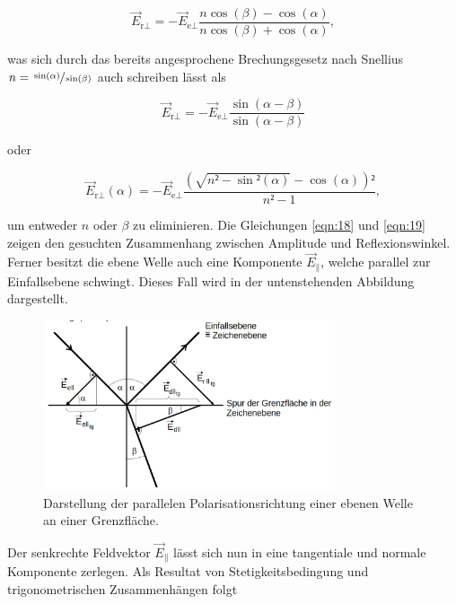 \begin{equation*}
    \vec{E}_{\text{r}\perp} = -\vec{E}_{\text{e}\perp}\frac{n\cos(\beta)-\cos(\alpha)}{n\cos(\beta)+\cos(\alpha)},
\end{equation*}

\noindent was sich durch das bereits angesprochene Brechungsgesetz nach Snellius $n = \sfrac{\sin(\alpha)}{\sin(\beta)}$ auch schreiben lässt als

\begin{equation}
    \vec{E}_{\text{r}\perp} = -\vec{E}_{\text{e}\perp}\frac{\sin(\alpha-\beta)}{\sin(\alpha-\beta)}
    \label{eqn:18}
\end{equation}

oder 

\begin{equation}
    \vec{E}_{\text{r}\perp}(\alpha) = -\vec{E}_{\text{e}\perp}\frac{\left(\sqrt{n²-\sin²(\alpha)}-\cos(\alpha)\right)²}{n²-1},
    \label{eqn:19}
\end{equation}

\noindent um entweder $n$ oder $\beta$ zu eliminieren. Die Gleichungen \eqref{eqn:18} und \eqref{eqn:19} zeigen den gesuchten Zusammenhang zwischen 
Amplitude und Reflexionswinkel.\\

\noindent Ferner besitzt die ebene Welle auch eine Komponente $\vec{E}_\parallel$, welche parallel zur Einfallsebene schwingt. Dieses Fall wird in der 
untenstehenden Abbildung dargestellt.

\begin{figure}
    \centering
    \includegraphics[height=5cm]{senkPolar.png}
    \caption{Darstellung der parallelen Polarisationsrichtung einer ebenen Welle an einer Grenzfläche\cite{Versuchsanleitung_v407}.}
    \label{fig:senkrechtPolar}
\end{figure}

\noindent Der senkrechte Feldvektor $\vec{E}_\parallel$ lässt sich nun in eine tangentiale und normale Komponente zerlegen. Als Resultat von 
Stetigkeitsbedingung und trigonometrischen Zusammenhängen folgt 

